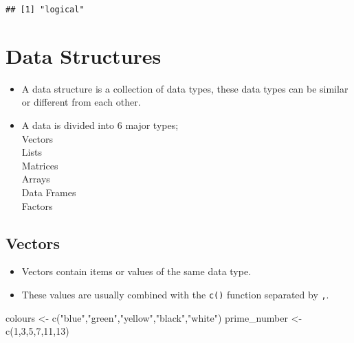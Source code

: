 \documentclass[
]{article}
\newenvironment{Shaded}{\begin{snugshade}}{\end{snugshade}}
\newcommand{\DecValTok}[1]{\textcolor[rgb]{0.00,0.00,0.81}{#1}}
\newcommand{\FunctionTok}[1]{\textcolor[rgb]{0.00,0.00,0.00}{#1}}
\newcommand{\NormalTok}[1]{#1}
\newcommand{\OtherTok}[1]{\textcolor[rgb]{0.56,0.35,0.01}{#1}}
\newcommand{\StringTok}[1]{\textcolor[rgb]{0.31,0.60,0.02}{#1}}
\providecommand{\tightlist}{%
  \setlength{\itemsep}{0pt}\setlength{\parskip}{0pt}}
\begin{document}
\begin{verbatim}
## [1] "logical"
\end{verbatim}

\hypertarget{data-structures}{%
\section{Data Structures}\label{data-structures}}

\begin{itemize}
\tightlist
\item
  A data structure is a collection of data types, these data types can
  be similar or different from each other.\\
\item
  A data is divided into 6 major types;\\
  Vectors\\
  Lists\\
  Matrices\\
  Arrays\\
  Data Frames\\
  Factors
\end{itemize}

\hypertarget{vectors}{%
\subsection{Vectors}\label{vectors}}

\begin{itemize}
\tightlist
\item
  Vectors contain items or values of the same data type.\\
\item
  These values are usually combined with the \texttt{c()} function
  separated by \texttt{,}.
\end{itemize}

\begin{Shaded}
\begin{Highlighting}[]
\NormalTok{colours }\OtherTok{\textless{}{-}} \FunctionTok{c}\NormalTok{(}\StringTok{"blue"}\NormalTok{,}\StringTok{"green"}\NormalTok{,}\StringTok{"yellow"}\NormalTok{,}\StringTok{"black"}\NormalTok{,}\StringTok{"white"}\NormalTok{)}
\NormalTok{prime\_number }\OtherTok{\textless{}{-}} \FunctionTok{c}\NormalTok{(}\DecValTok{1}\NormalTok{,}\DecValTok{3}\NormalTok{,}\DecValTok{5}\NormalTok{,}\DecValTok{7}\NormalTok{,}\DecValTok{11}\NormalTok{,}\DecValTok{13}\NormalTok{)}
\end{Highlighting}
\end{Shaded}
\end{document}
